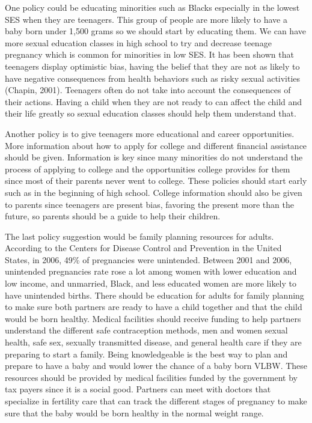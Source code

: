 \documentclass{article}
\begin{document}
One policy could be educating minorities such as Blacks especially in the lowest SES when they are teenagers. This group of people are more likely to have a baby born under 1,500 grams so we should start by educating them. We can have more sexual education classes in high school to try and decrease teenage pregnancy which is common for minorities in low SES. It has been shown that teenagers display optimistic bias, having the belief that they are not as likely to have negative consequences from health behaviors such as risky sexual activities (Chapin, 2001). Teenagers often do not take into account the consequences of their actions. Having a child when they are not ready to can affect the child and their life greatly so sexual education classes should help them understand that. 

Another policy is to give teenagers more educational and career opportunities. More information about how to apply for college and different financial assistance should be given. Information is key since many minorities do not understand the process of applying to college and the opportunities college provides for them since most of their parents never went to college. These policies should start early such as in the beginning of high school. College information should also be given to parents since teenagers are present bias, favoring the present more than the future, so parents should be a guide to help their children.  

The last policy suggestion would be family planning resources for adults. According to the Centers for Disease Control and Prevention in the United States, in 2006, 49\% of pregnancies were unintended. Between 2001 and 2006, unintended pregnancies rate rose a lot among women with lower education and low income, and unmarried, Black, and less educated women are more likely to have unintended births. There should be education for adults for family planning to make sure both partners are ready to have a child together and that the child would be born healthy. Medical facilities should receive funding to help partners understand the different safe contraception methods, men and women sexual health, safe sex, sexually transmitted disease, and general health care if they are preparing to start a family. Being knowledgeable is the best way to plan and prepare to have a baby and would lower the chance of a baby born VLBW. These resources should be provided by medical facilities funded by the government by tax payers since it is a social good. Partners can meet with doctors that specialize in fertility care that can track the different stages of pregnancy to make sure that the baby would be born healthy in the normal weight range. 
\end{document}

